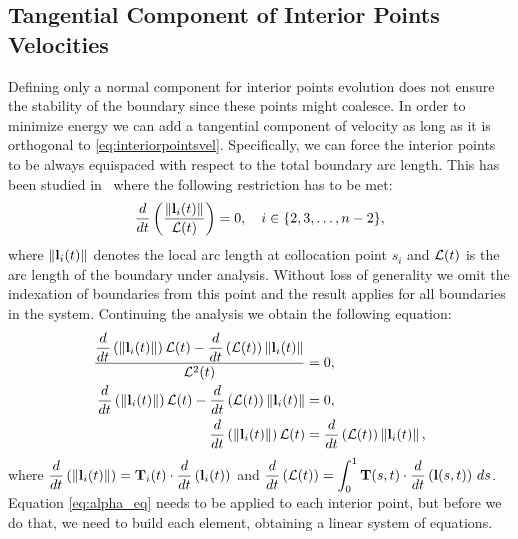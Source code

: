 \subsection{Tangential Component of Interior Points Velocities}
\label{sec:tangential_component}
Defining only a normal component for interior points evolution does not ensure the stability of the boundary since these points might coalesce. In order to minimize energy we can add a tangential component of velocity as long as it is orthogonal to \eqref{eq:interiorpointsvel}. Specifically, we can force the interior points to be always equispaced with respect to the total boundary arc length. This has been studied in~\cite{Mikula2001, Barrett2007, Barrett2010} where the following restriction has to be met:
\begin{equation*}
    \dfrac{d}{dt}\left(\dfrac{\left\lVert\mathbf{l}_i(t)\right\rVert}{\mathcal{L}(t)}\right)=0, \quad i\in \{2,3,\dots,n-2\},
\end{equation*}
where $\left\lVert\mathbf{l}_i(t)\right\rVert$ denotes the local arc length at collocation point $s_i$ and $\mathcal{L}(t)$ is the arc length of the boundary under analysis. Without loss of generality we omit the indexation of boundaries from this point and the result applies for all boundaries in the system. Continuing the analysis we obtain the following equation:
%
\begin{align}
    \dfrac{\dfrac{d}{dt}\left(\left\lVert\mathbf{l}_i(t)\right\rVert\right)
    \mathcal{L}(t)-
    \dfrac{d}{dt}\left(\mathcal{L}(t)\right)
    \left\lVert\mathbf{l}_i(t)\right\rVert }{\mathcal{L}^2(t)}&=0,\nonumber\\
    \dfrac{d}{dt}\left(\left\lVert\mathbf{l}_i(t)\right\rVert\right)
    \mathcal{L}(t)-
    \dfrac{d}{dt}\left(\mathcal{L}(t)\right)
    \left\lVert\mathbf{l}_i(t)\right\rVert &=0,\nonumber\\
    \dfrac{d}{dt}\left(\left\lVert\mathbf{l}_i(t)\right\rVert\right)
    \mathcal{L}(t)&=
    \dfrac{d}{dt}\left(\mathcal{L}(t)\right)
    \left\lVert\mathbf{l}_i(t)\right\rVert,\label{eq:alpha_eq}
\end{align}
%
where $\dfrac{d}{dt}\left(\left\lVert\mathbf{l}_i(t)\right\rVert\right)=\mathbf{T}_i(t)\cdot\dfrac{d}{dt}\left(\mathbf{l}_i(t)\right)$  and $\dfrac{d}{dt}\left(\mathcal{L}(t)\right)=\displaystyle{\int_0^1 \mathbf{T}(s,t)\cdot \dfrac{d}{dt}\left(\mathbf{l}(s,t)\right)\,ds}$.
Equation \eqref{eq:alpha_eq} needs to be applied to
each interior point, but before we do that, we need to build each element, obtaining a linear system of equations.

